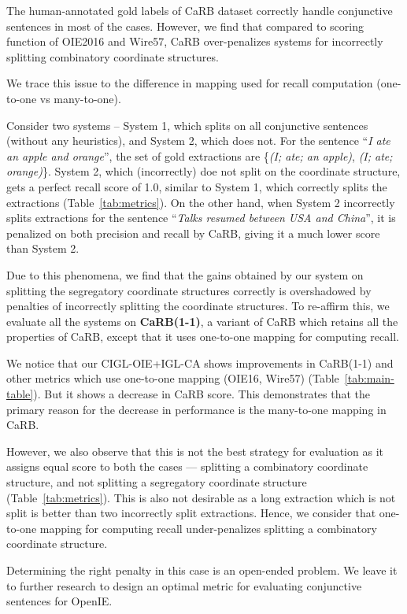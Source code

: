 \documentclass[11pt,a4paper]{article}
\newcommand{\shortname}{{\scshape IGL}}
\begin{document}
The human-annotated gold labels of CaRB dataset correctly handle conjunctive sentences in most of the cases. However, we find that compared to scoring function of OIE2016 and Wire57, CaRB over-penalizes systems for incorrectly splitting combinatory coordinate structures.

We trace this issue to the difference in mapping used for recall computation (one-to-one vs many-to-one). 

Consider two systems -- System 1, which splits on all conjunctive sentences (without any heuristics), and System 2, which does not. For the sentence ``\textit{I ate an apple and orange}'', the set of gold extractions are \{\textit{(I; ate; an apple)}, \textit{(I; ate; orange)}\}. System 2, which (incorrectly) doe not split on the coordinate structure, gets a perfect recall score of 1.0, similar to System 1, which correctly splits the extractions (Table~\ref{tab:metrics}). On the other hand, when System 2 incorrectly splits extractions for the sentence ``\textit{Talks resumed between USA and China}'', it is penalized on both precision and recall by CaRB, giving it a much lower score than System 2.

Due to this phenomena, we find that the gains obtained by our system on splitting the segregatory coordinate structures correctly is overshadowed by penalties of incorrectly splitting the coordinate structures. To re-affirm this, we evaluate all the systems on \textbf{CaRB(1-1)}, a variant of CaRB which retains all the properties of CaRB, except that it uses one-to-one mapping for computing recall.

We notice that our C\shortname-OIE+\shortname-CA shows improvements in CaRB(1-1) and other metrics which use one-to-one mapping (OIE16, Wire57) (Table~\ref{tab:main-table}). But it shows a decrease in CaRB score. This demonstrates that the primary reason for the decrease in performance is the many-to-one mapping in CaRB.


However, we also observe that this is not the best strategy for evaluation as it assigns equal score to both the cases --- splitting a combinatory coordinate structure, and not splitting a segregatory coordinate structure (Table~\ref{tab:metrics}). This is also not desirable as a long extraction which is not split is better than two incorrectly split extractions. Hence, we consider that one-to-one mapping for computing recall under-penalizes splitting a combinatory coordinate structure.

Determining the right penalty in this case is an open-ended problem. We leave it to further research to design an optimal metric for evaluating conjunctive sentences for OpenIE.
\end{document}
